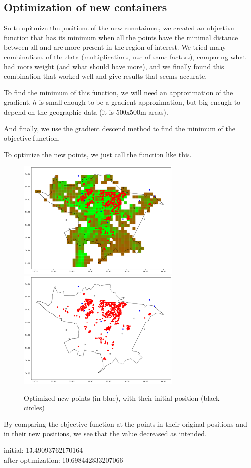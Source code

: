 \subsection{Optimization of new containers}
So to opitmize the positions of the new conntainers, we created an objective function that has its minimum when all the points have the minimal distance between all and are more present in the region of interest.
We tried many combinations of the data (multiplications, use of some factors), comparing what had more weight (and what should have more), and we finally found this combination that worked well and give results that seems accurate.

To find the minimum of this function, we will need an approximation of the gradient. $h$ is small enough to be a gradient approximation, but big enough to depend on the geographic data (it is 500x500m areas).

And finally, we use the gradient descend method to find the minimum of the objective function.

To optimize the new points, we just call the function like this.

\begin{figure}[H]
    \centering
    \includegraphics[width=8cm]{images/part3/pointsNewAfterGradient.png}
    \includegraphics[width=8cm]{images/part3/pointsNewAfterGradwithoutecopop.png}
    \caption{Optimized new points (in blue), with their initial position (black circles)}
    \label{fig:newoptimized}
\end{figure}
By comparing the objective function at the points in their original positions and in their new positions, we see that the value decreased  as intended.
\begin{resultbox}
initial:  13.49093762170164\\
after optimization:  10.698442833207066
\end{resultbox}

